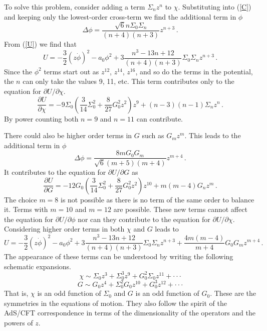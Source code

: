 \documentclass[aps,prd,12pt,nofootinbib]{revtex4}
\newcommand{\be}{\begin{equation}}
\newcommand{\ee}{\end{equation}}
\newcommand{\bd}{\begin{displaymath}}
\newcommand{\ed}{\end{displaymath}}
\def\tthalf{{\textstyle{\frac{3}{2}}}}
\def\phidot{\dot{\phi}}
\def\rt6{\sqrt{6}}
\begin{document}
To solve this problem, consider adding a term $\Sigma_n z^n$ to $\chi$.  
Substituting into (\ref{C}) and keeping only the lowest-order cross-term we find the additional term in $\phi$
\be
\Delta \phi = \frac{\rt6 n \Sigma_0 \Sigma_n}{(n+4)(n+3)} z^{n+3} \, .
\ee
From (\ref{U}) we find that
\be
U = -\tthalf (z\phidot)^2 - a_0\phi^2 +3 \frac{n^3 -13n +12}{(n+4)(n+3)} \Sigma_0 \Sigma_n z^{n+3} \, .
\ee
Since the $\phi^2$ terms start out as $z^{12}$, $z^{14}$, $z^{16}$, and so do the terms in the potential, the $n$ can only take the values 9, 11, etc.  
This term contributes only to the equation for $\partial U/\partial \chi$.
\be
\frac{\partial U}{\partial \chi} = -9\Sigma_0 \left( \frac{3}{14} \Sigma_0^2 + \frac{8}{27} G_0^2 z^2 \right) z^9 + (n-3)(n-1) \Sigma_n z^n \, .
\ee
By power counting both $n=9$ and $n=11$ can contribute.  

There could also be higher order terms in $G$ such as $G_m z^m$.  
This leads to the additional term in $\phi$
\be
\Delta \phi = \frac{8 m G_0 G_m}{\rt6 (m+5)(m+4)} z^{m+4} \, .
\ee
It contributes to the equation for $\partial U/\partial G$ as
\be
\frac{\partial U}{\partial G} = -12G_0 \left( \frac{3}{14} \Sigma_0^2 + \frac{8}{27} G_0^2 z^2 \right) z^{10}
+ m (m-4) G_n z^m \, .
\ee
The choice $m=8$ is not possible as there is no term of the same order to balance it.  
Terms with $m=10$ and $m=12$ are possible.  
These new terms cannot affect the equation for $\partial U/\partial \phi$  nor can they contribute to the equation for $\partial U/\partial \chi$.  
Considering higher order terms in both $\chi$ and $G$ leads to
\be
U = -\tthalf (z\phidot)^2 - a_0\phi^2 +3 \frac{n^3 -13n +12}{(n+4)(n+3)} \Sigma_0 \Sigma_n z^{n+3}
+ \frac{4m(m-4)}{m+4} G_0 G_m z^{m+4} \, .
\ee 
The appearance of these terms can be understood by writing the following schematic expansions.
\bd
\chi \sim \Sigma_0 z^3 + \Sigma_0^3 z^9 + G_0^2 \Sigma_0 z^{11} + \cdot\cdot\cdot
\ed
\bd
G \sim G_0 z^4 + \Sigma_0^2 G_0 z^{10} + G_0^3 z^{12} + \cdot\cdot\cdot
\ed
That is, $\chi$ is an odd function of $\Sigma_0$ and $G$ is an odd function of $G_0$.  
These are the symmetries in the equations of motion.  
They also follow the spirit of the AdS/CFT correspondence in terms of the dimensionality of the operators and the powers of $z$.
\end{document}
